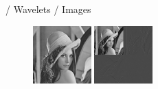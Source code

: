 \documentclass{beamer}
\def\RImageSize{0.2\textwidth}
\def\RImageSpace{\hspace{1cm}}
\begin{document}
\begin{frame}{/ Wavelets / Images}

  \begin{figure}[hbt]
    \begin{center}
      \includegraphics[width=\RImageSize]{lena512.jpg}
      \RImageSpace
      \includegraphics[width=\RImageSize]{lena-1step.jpg}

\end{center}
\end{figure}
\end{frame}
\end{document}
